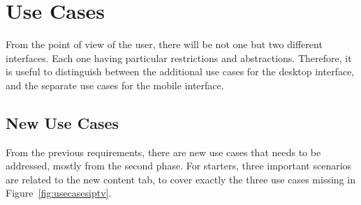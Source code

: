 \section{Use Cases} %
\label{sec:use_cases}

From the point of view of the user, there will be not one but two different interfaces.
Each one having particular restrictions and abstractions.
Therefore, it is useful to distinguish between the additional use cases for the desktop interface, and the separate use cases for the mobile interface.

\subsection{New Use Cases} %
\label{sub:new_use_cases}

From the previous requirements, there are new use cases that needs to be addressed, mostly from the second phase.
For starters, three important scenarios are related to the new content tab, to cover exactly the three use cases missing in Figure~\vref{fig:usecasesiptv}.

